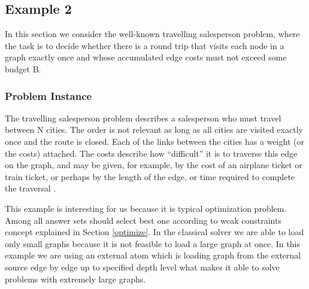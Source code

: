 \documentclass[a4paper, titlepage]{article}
\begin{document}
\subsection{Example 2}
\label{traveling}
In this section we consider the well-known travelling 
salesperson problem, where the task is to decide whether there 
is a round trip that visits each node in a graph exactly 
once and whose accumulated edge costs must not exceed some 
budget B.

\subsubsection{Problem Instance}
The travelling salesperson problem describes a salesperson who 
must travel between N cities. The order is not relevant as long as all cities are visited exactly once and the route is closed. Each of the 
links between the cities has a weight (or the 
costs) attached. The costs describe how ``difficult'' it is to 
traverse this edge on the graph, and may be given, for 
example, by the cost of an airplane ticket or train ticket, 
or perhaps by the length of the edge, or time required to 
complete the traversal \cite{wiki}.

This example is interesting for us because it is typical 
optimization problem. Among all answer sets \dlvhex{} 
should select best one according to weak constraints 
concept explained in Section \ref{optimize}. In the 
classical solver we are able to load only small graphs 
because it is not feasible to load a large graph at once. In 
this example we are using an external atom which is loading 
graph from the external source edge by edge up to specified 
depth level what makes it able to solve problems with 
extremely large graphs.        
\end{document}

